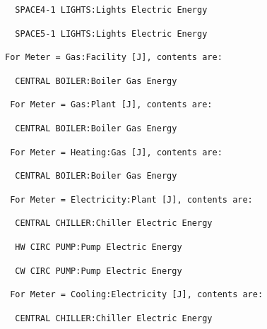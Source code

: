 \begin{lstlisting}
  SPACE4-1 LIGHTS:Lights Electric Energy
\end{lstlisting}

\begin{lstlisting}
  SPACE5-1 LIGHTS:Lights Electric Energy
\end{lstlisting}

\begin{lstlisting}
For Meter = Gas:Facility [J], contents are:
\end{lstlisting}

\begin{lstlisting}
  CENTRAL BOILER:Boiler Gas Energy
\end{lstlisting}

\begin{lstlisting}
 For Meter = Gas:Plant [J], contents are:
\end{lstlisting}

\begin{lstlisting}
  CENTRAL BOILER:Boiler Gas Energy
\end{lstlisting}

\begin{lstlisting}
 For Meter = Heating:Gas [J], contents are:
\end{lstlisting}

\begin{lstlisting}
  CENTRAL BOILER:Boiler Gas Energy
\end{lstlisting}

\begin{lstlisting}
 For Meter = Electricity:Plant [J], contents are:
\end{lstlisting}

\begin{lstlisting}
  CENTRAL CHILLER:Chiller Electric Energy
\end{lstlisting}

\begin{lstlisting}
  HW CIRC PUMP:Pump Electric Energy
\end{lstlisting}

\begin{lstlisting}
  CW CIRC PUMP:Pump Electric Energy
\end{lstlisting}

\begin{lstlisting}
 For Meter = Cooling:Electricity [J], contents are:
\end{lstlisting}

\begin{lstlisting}
  CENTRAL CHILLER:Chiller Electric Energy
\end{lstlisting}

